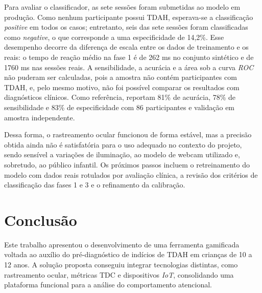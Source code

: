 \documentclass[11pt,a4paper]{article}
\begin{document}
Para avaliar o classificador, as sete sessões foram submetidas ao modelo em produção. Como nenhum participante possui TDAH, esperava-se a classificação \textit{positive} em todos os casos; entretanto, seis das sete sessões foram classificadas como \textit{negative}, o que corresponde a uma especificidade de 14,2\%. Esse desempenho decorre da diferença de escala entre os dados de treinamento e os reais: o tempo de reação médio na fase 1 é de 262 ms no conjunto sintético e de 1760 ms nas sessões reais. A sensibilidade, a acurácia e a área sob a curva \textit{ROC} não puderam ser calculadas, pois a amostra não contém participantes com TDAH, e, pelo mesmo motivo, não foi possível comparar os resultados com diagnósticos clínicos. Como referência, \cite{Wiebe2024} reportam 81\% de acurácia, 78\% de sensibilidade e 83\% de especificidade com 86 participantes e validação em amostra independente.

Dessa forma, o rastreamento ocular funcionou de forma estável, mas a precisão obtida ainda não é satisfatória para o uso adequado no contexto do projeto, sendo sensível a variações de iluminação, ao modelo de webcam utilizado e, sobretudo, ao público infantil. Os próximos passos incluem o retreinamento do modelo com dados reais rotulados por avaliação clínica, a revisão dos critérios de classificação das fases 1 e 3 e o refinamento da calibração.

\section{Conclusão}
Este trabalho apresentou o desenvolvimento de uma ferramenta gamificada voltada ao auxílio do pré-diagnóstico de indícios de TDAH em crianças de 10 a 12 anos. A solução proposta conseguiu integrar tecnologias distintas, como rastreamento ocular, métricas TDC e dispositivos \textit{IoT}, consolidando uma plataforma funcional para a análise do comportamento atencional.
\end{document}
